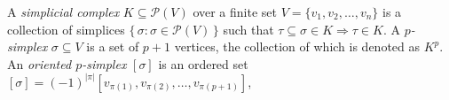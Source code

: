 A \emph{simplicial complex} $K \subseteq \mathcal{P}(V)$ over a finite set $V = \{v_1, v_2, \dots, v_n \}$ is a collection of simplices $\{\, \sigma : \sigma \in \mathcal{P}(V) \,\}$ such that $\tau \subseteq \sigma \in K \Rightarrow \tau \in K$.
A \emph{$p$-simplex} $\sigma \subseteq V$ is a set of $p+1$ vertices, the collection of which is denoted as $K^p$.
An \emph{oriented $p$-simplex} $[\sigma]$ is an ordered set $[\sigma] = (-1)^{\lvert \pi \rvert } \left [v_{\pi(1)}, v_{\pi(2)}, \dots, v_{\pi(p+1)} \right ]$,

